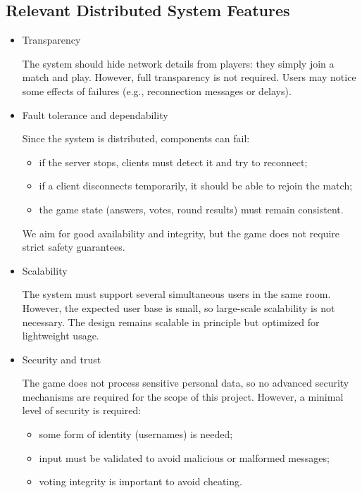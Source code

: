 \documentclass{scrartcl}
\begin{document}
\subsection{Relevant Distributed System Features}
\label{ds-features}

\begin{itemize}
  \item Transparency
  
    The system should hide network details from players: they simply join a match and play. 
    However, full transparency is not required. 
    Users may notice some effects of failures (e.g., reconnection messages or delays).

  \item Fault tolerance and dependability
  
    Since the system is distributed, components can fail:
    \begin{itemize}
      \item if the server stops, clients must detect it and try to reconnect;
      \item if a client disconnects temporarily, it should be able to rejoin the match;
      \item the game state (answers, votes, round results) must remain consistent.
    \end{itemize}
  We aim for good availability and integrity, but the game does not require strict safety guarantees.

  \item Scalability
  
    The system must support several simultaneous users in the same room.
    However, the expected user base is small, so large-scale scalability is not necessary.
    The design remains scalable in principle but optimized for lightweight usage.

  \item Security and trust
  
    The game does not process sensitive personal data, so no advanced security mechanisms 
    are required for the scope of this project. 
    However, a minimal level of security is required:
    \begin{itemize}
      \item some form of identity (usernames) is needed;
      \item input must be validated to avoid malicious or malformed messages;
      \item voting integrity is important to avoid cheating.
    \end{itemize}


\end{itemize}
\end{document}
